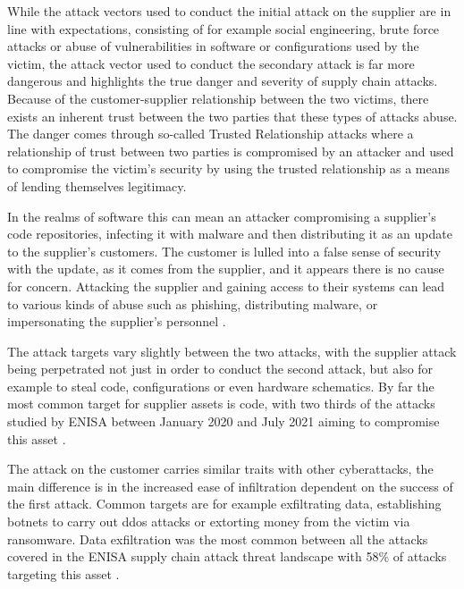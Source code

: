 While the attack vectors used to conduct the initial attack on the supplier are in line with expectations, 
consisting of for example social engineering, brute force attacks or abuse of vulnerabilities in software
or configurations used by the victim, the attack vector used to conduct the secondary attack is far more
dangerous and highlights the true danger and severity of supply chain attacks.
Because of the customer-supplier relationship between the two victims, there exists an inherent trust
between the two parties that these types of attacks abuse. The danger comes through so-called Trusted Relationship
attacks where a relationship of trust between two parties is compromised by an attacker and used to compromise
the victim's security by using the trusted relationship as a means of lending themselves legitimacy.

In the realms of software this can mean an attacker compromising a supplier's code repositories, infecting
it with malware and then distributing it as an update to the supplier's customers. The customer is lulled into
a false sense of security with the update, as it comes from the supplier, and it appears there is no cause for 
concern. Attacking the supplier and gaining access to their systems can lead to various kinds of abuse 
such as phishing, distributing malware, or impersonating the supplier's personnel \cite{enisa_supply_chain_threat_landscape}.

The attack targets vary slightly between the two attacks, with the supplier attack being perpetrated not just 
in order to conduct the second attack, but also for example to steal code, configurations or even hardware schematics.
By far the most common target for supplier assets is code, with two thirds of the attacks studied by \acrshort{ENISA}
between January 2020 and July 2021 aiming to compromise this asset \cite{enisa_supply_chain_threat_landscape}. 

The attack on the customer carries similar traits with other cyberattacks, the main difference is in the increased 
ease of infiltration dependent on the success of the first attack.
Common targets are for example exfiltrating data, establishing botnets to carry out \acrfull{ddos} attacks or
extorting money from the victim via ransomware. Data exfiltration was the most common between all the attacks
covered in the \acrshort{ENISA} supply chain attack threat landscape with 58\% of attacks targeting this asset
\cite{enisa_supply_chain_threat_landscape}. 


